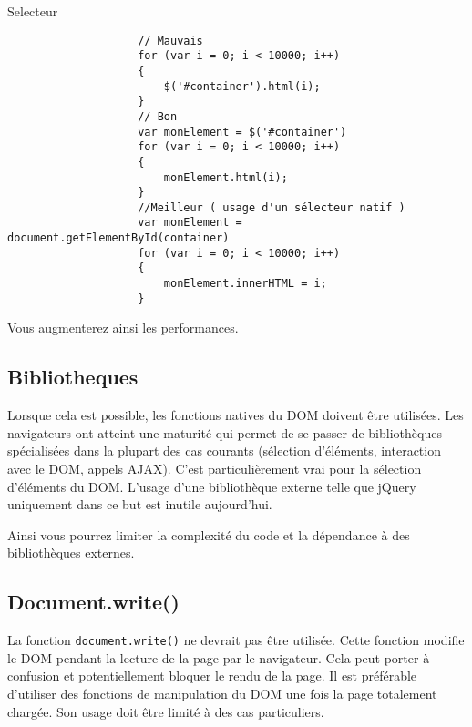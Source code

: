 			\begin{cbox}{Selecteur}
				\begin{verbatim}
					// Mauvais
					for (var i = 0; i < 10000; i++)
					{
					    $('#container').html(i);
					}
					// Bon
					var monElement = $('#container')
					for (var i = 0; i < 10000; i++)
					{
					    monElement.html(i);
					}
					//Meilleur ( usage d'un sélecteur natif )
					var monElement = document.getElementById(container)
					for (var i = 0; i < 10000; i++)
					{
					    monElement.innerHTML = i;
					}
				\end{verbatim}
			\end{cbox}

			Vous augmenterez ainsi les performances.

		\subsection{Bibliotheques}
			Lorsque cela est possible, les fonctions natives du DOM doivent être utilisées. Les navigateurs ont atteint une maturité qui permet de se passer de bibliothèques spécialisées dans la plupart des cas courants (sélection d'éléments, interaction avec le DOM, appels AJAX). C'est particulièrement vrai pour la sélection d'éléments du DOM. L'usage d'une bibliothèque externe telle que jQuery uniquement dans ce but est inutile aujourd'hui.

			Ainsi vous pourrez limiter la complexité du code et la dépendance à des bibliothèques externes.

		\subsection{Document.write()}
			La fonction \verb+document.write()+ ne devrait pas être utilisée. Cette fonction modifie le DOM pendant la lecture de la page par le navigateur. Cela peut porter à confusion et potentiellement bloquer le rendu de la page. Il est préférable d'utiliser des fonctions de manipulation du DOM une fois la page totalement chargée. Son usage doit être limité à des cas particuliers.

